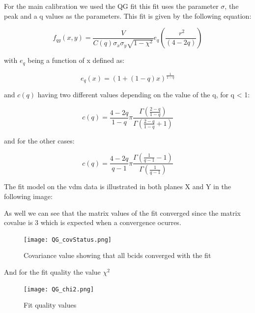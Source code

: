 For the main calibration we used the QG fit this fit uses the parameter $\sigma$, the peak and a q values as the parameters. This fit is given by the following equation:


\begin{equation}
f_{qg}(x,y) = \frac{V}{C(q) \sigma_{x} \sigma_{y}\sqrt{1-\chi^{2}}} e_{q}(\frac{\ r^{2}}{(4-2q)}) 
\end{equation}

with $e_{q}$ being a function of x defined as: 

\begin{equation}
e_{q}(x) = (1+(1-q)x)^{\frac{1}{1-q}}
\end{equation}

and $c(q)$ having two different values depending on the value of the q, for q < 1: 

\begin{equation}
c(q) = \frac{4-2q}{1-q} \pi \frac{\Gamma (\frac{2-q}{1-q})}{\Gamma (\frac{2-q}{1-q} + 1)}
\end{equation}

and for the other cases:

\begin{equation}
c(q) = \frac{4-2q}{q-1} \pi \frac{\Gamma (\frac{1}{q-1} - 1)}{\Gamma (\frac{1}{q-1})}
\end{equation}

The fit model on the vdm data is illustrated in both planes X and Y in the following image: 


As well we can see that the matrix values of the fit converged since the matrix covalue is 3 which is expected when a convergence ocurres. 

\begin{figure}[h]
    \centering
    \texttt{[image: QG\_covStatus.png]}
    \caption{Covariance value showing that all bcids converged with the fit}
    \label{fig:QGfit}
\end{figure}

And for the fit quality the value $\chi^{2}$ 

\begin{figure}[h]
    \centering
    \texttt{[image: QG\_chi2.png]}
    \caption{Fit quality values}
    \label{fig:QGchi2}
\end{figure}



